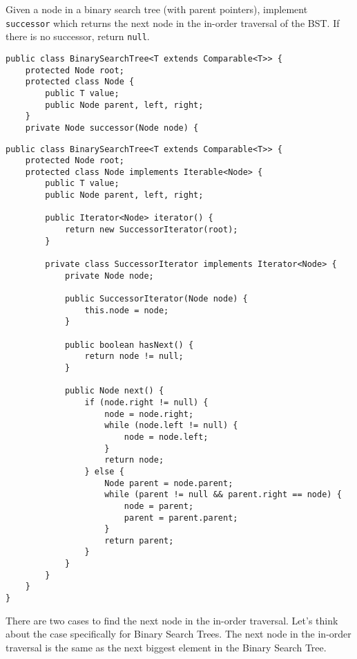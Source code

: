 \begin{blocksection}
\question Given a node in a binary search tree (with parent pointers),
implement \lstinline$successor$ which returns the next node in the in-order traversal of the BST. If there is no successor, return \lstinline$null$.

\ifprintanswers\else
\begin{lstlisting}
public class BinarySearchTree<T extends Comparable<T>> {
    protected Node root;
    protected class Node {
        public T value;
        public Node parent, left, right;
    }
    private Node successor(Node node) {
\end{lstlisting}
\fi
\end{blocksection}

\begin{solution}[2.5in]
\begin{lstlisting}
public class BinarySearchTree<T extends Comparable<T>> {
    protected Node root;
    protected class Node implements Iterable<Node> {
        public T value;
        public Node parent, left, right;
        
        public Iterator<Node> iterator() {
            return new SuccessorIterator(root);
        }
        
        private class SuccessorIterator implements Iterator<Node> {
            private Node node;
            
            public SuccessorIterator(Node node) {
                this.node = node;
            }
            
            public boolean hasNext() {
                return node != null;
            }
            
            public Node next() {
                if (node.right != null) {
                    node = node.right;
                    while (node.left != null) {
                        node = node.left;
                    }
                    return node;
                } else {
                    Node parent = node.parent;
                    while (parent != null && parent.right == node) {
                        node = parent;
                        parent = parent.parent;
                    }
                    return parent;
                }
            }
        }
    }
}
\end{lstlisting}

There are two cases to find the next node in the in-order traversal. Let's
think about the case specifically for Binary Search Trees. The next node in the
in-order traversal is the same as the next biggest element in the Binary Search
Tree.


\end{solution}
